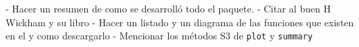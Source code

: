 \documentclass[../Main/Main.tex]{subfiles}
\begin{document}
- Hacer un resumen de como se desarrolló todo el paquete.
- Citar al buen H Wickham y su libro
- Hacer un listado y un diagrama de las funciones que existen en el y como descargarlo
- Mencionar los métodos S3 de \verb|plot| y \verb|summary|
\end{document}
